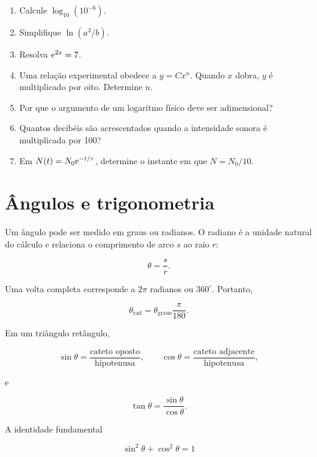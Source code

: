 \begin{enumerate}
  \item Calcule $\log_{10}(10^{-6})$.
  \item Simplifique $\ln(a^3/b)$.
  \item Resolva $\mathrm{e}^{2x}=7$.
  \item Uma relação experimental obedece a $y=Cx^n$. Quando $x$ dobra, $y$ é multiplicado por oito. Determine $n$.
  \item Por que o argumento de um logaritmo físico deve ser adimensional?
  \item Quantos decibéis são acrescentados quando a intensidade sonora é multiplicada por 100?
  \item Em $N(t)=N_0\mathrm{e}^{-t/\tau}$, determine o instante em que $N=N_0/10$.
\end{enumerate}

\section{Ângulos e trigonometria}

Um ângulo pode ser medido em graus ou radianos. O radiano é a unidade natural do cálculo e relaciona o comprimento de arco $s$ ao raio $r$:

\begin{equation}
  \theta=\frac{s}{r}.
\end{equation}

Uma volta completa corresponde a $2\pi$ radianos ou $360^\circ$. Portanto,

\begin{equation}
  \theta_{\mathrm{rad}}=\theta_{\mathrm{graus}}\frac{\pi}{180}.
\end{equation}

Em um triângulo retângulo,

\begin{equation}
  \sin\theta=\frac{\text{cateto oposto}}{\text{hipotenusa}},\qquad
  \cos\theta=\frac{\text{cateto adjacente}}{\text{hipotenusa}},
\end{equation}

e


\begin{equation}
  \tan\theta=\frac{\sin\theta}{\cos\theta}.
\end{equation}

A identidade fundamental

\begin{equation}
  \sin^2\theta+\cos^2\theta=1
\end{equation}

